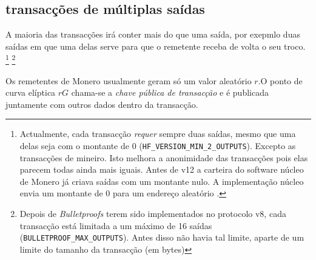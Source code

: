 \subsection{transacções de múltiplas saídas}
\label{sec:multi_out_transactions}

A maioria das transacções irá conter mais do que uma saída, por exepmlo duas saídas em que uma delas serve para que o remetente receba de volta o seu troco.
\footnote{Actualmente, cada transacção {\em requer} sempre duas saídas, mesmo que uma delas seja com o montante de $0$ ({\tt HF\_VERSION\_MIN\_2\_OUTPUTS}). Excepto as transacções de mineiro. Isto melhora a anonimidade das transacções pois elas parecem todas ainda mais iguais. Antes de v12 a carteira do software núcleo de Monero já criava saídas com um montante nulo. A implementação núcleo envia um montante de 0 para um endereço aleatório .}   
\footnote{Depois de {\em Bulletproofs} terem sido implementados no protocolo v8, cada transacção está limitada a um máximo de 16 saídas ({\tt BULLETPROOF\_MAX\_OUTPUTS}). Antes disso não havia tal limite, aparte de um limite do tamanho da transacção (em bytes)}

Os remetentes de Monero usualmente geram só um valor aleatório $r$.\newline O ponto de curva elíptica $r G$ chama-se a {\em chave pública de transacção} e é publicada juntamente com outros dados dentro da transacção.

